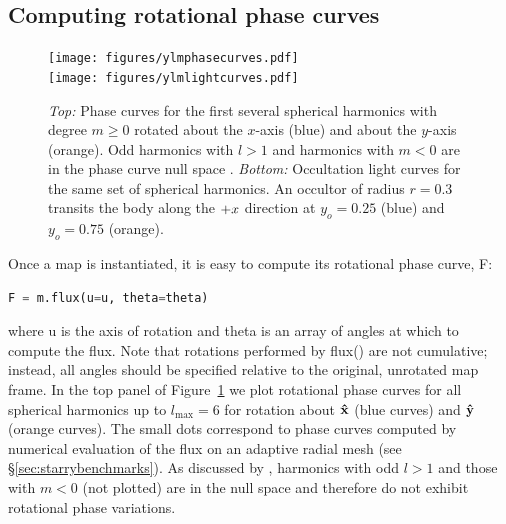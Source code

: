 \documentclass[modern]{aastex61}
\begin{document}
\subsection{Computing rotational phase curves}
\label{sec:starryphasecurves}
%
\begin{figure}[p!]
    \begin{centering}
    \texttt{[image: figures/ylmphasecurves.pdf]}
    \\[1em]
    \texttt{[image: figures/ylmlightcurves.pdf]}
    \caption{\label{fig:ylmlightcurves}
             \emph{Top:} Phase curves for the first several spherical
             harmonics with degree $m \ge 0$ rotated about the $x$-axis
             (blue) and about the $y$-axis (orange).
             Odd harmonics with $l > 1$ and harmonics with $m < 0$ are
             in the phase curve null space \citep{CowanFuentesHaggard2013}.
             \emph{Bottom:} Occultation light curves for the same
             set of spherical harmonics. An occultor of radius $r=0.3$
             transits the body along the $+\mbox{$x$}$ direction at $y_o = 0.25$
             (blue) and $y_o = 0.75$ (orange). }
    \end{centering}
\end{figure}
%
Once a map is instantiated, it is easy to compute its rotational
phase curve, \textsf{F}:
%
\begin{lstlisting}[language=Python,firstnumber=last]
F = m.flux(u=u, theta=theta)
\end{lstlisting}
%
where \textsf{u} is the axis of rotation and \textsf{theta} is an array of
angles at which to compute the flux. Note that rotations performed
by \textsf{flux()} are not cumulative; instead, all angles should be specified
relative to the original, unrotated map frame.
%
In the top panel of Figure~\ref{fig:ylmlightcurves} we plot rotational phase curves
for all spherical harmonics
up to $l_\mathrm{max} = 6$ for rotation about $\mathbf{\hat{x}}$ (blue curves) and $\mathbf{\hat{y}}$
(orange curves). The small dots correspond to phase curves computed by numerical
evaluation of the flux on an adaptive radial mesh (see \S\ref{sec:starrybenchmarks}).
As discussed by \citet{CowanFuentesHaggard2013}, harmonics with
odd $l > 1$ and those with $m < 0$ (not plotted) are in the null space and
therefore do not exhibit rotational phase variations.

%
\end{document}
